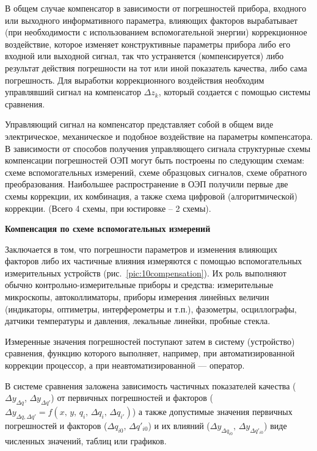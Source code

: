 В общем случае компенсатор в зависимости от погрешностей прибора, входного или выходного информативного параметра, влияющих факторов вырабатывает (при необходимости с использованием вспомогательной энергии) коррекционное воздействие, которое изменяет конструктивные параметры прибора либо его входной или выходной сигнал, так что устраняется (компенсируется) либо результат действия погрешности на тот или иной показатель качества, либо сама погрешность. Для выработки коррекционного воздействия необходим управлявший сигнал на компенсатор $ \Delta z_k $, который создается с помощью системы сравнения.

Управляющий сигнал на компенсатор представляет собой в общем виде электрическое, механическое и подобное воздействие на параметры компенсатора.
В зависимости от способов получения управляющего сигнала структурные схемы компенсации погрешностей ОЭП могут быть построены по следующим схемам: схеме вспомогательных измерений, схеме образцовых сигналов, схеме обратного преобразования. Наибольшее распространение в ОЭП получили первые две схемы коррекции, их комбинация, а также схема цифровой (алгоритмической) коррекции. (Всего 4 схемы, при юстировке -- 2 схемы).

\begin{flushleft}
	\textbf{Компенсация по схеме вспомогательных измерений}
\end{flushleft}

Заключается в том, что погрешности параметров и изменения влияющих факторов либо их частичные влияния измеряются с помощью вспомогательных измерительных устройств (рис.~\ref{pic:10compensation}). Их роль выполняют обычно контрольно-измерительные приборы и средства: измерительные микроскопы, автоколлиматоры, приборы измерения линейных величин (индикаторы, оптиметры, интерферометры и т.п.), фазометры, осциллографы, датчики температуры и давления, лекальные линейки, пробные стекла.

Измеренные значения погрешностей поступают затем в систему (устройство) сравнения, функцию которого выполняет, например, при автоматизированной коррекции процессор, а при неавтоматизированной --- оператор. 

В системе сравнения заложена зависимость частичных показателей качества ($ \Delta y_{\Delta q} $, $ \Delta y_{\Delta q'} $) от первичных погрешностей и факторов ($ \Delta y_{\Delta q, \Delta q'} = f(x,\,y,\, q_i, \, \Delta q_i,\, \Delta q_{i'}) $) а также допустимые значения первичных погрешностей и факторов ($ \Delta q_{i0},\, \Delta q'_{i0} $) и их влияний ($ \Delta y_{\Delta q_{i0}},\, \Delta y_{\Delta q'_{i0}} $) виде численных значений, таблиц или графиков.

